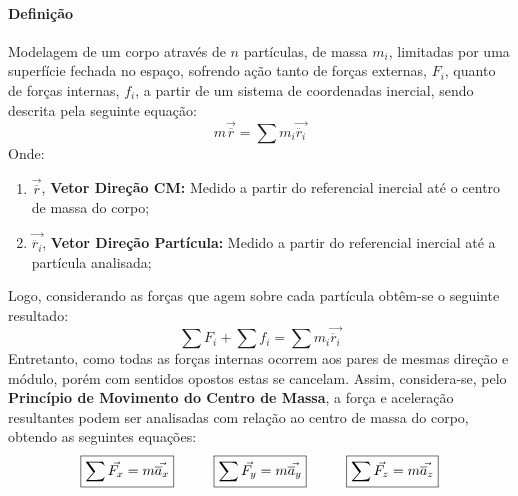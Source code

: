 \documentclass{article}
\begin{document}
            \paragraph{Definição}Modelagem de um corpo através de $n$ partículas, de massa $m_{i}$, limitadas por uma superfície fechada no espaço, sofrendo ação tanto de forças externas, $F_{i}$, quanto de forças internas, $f_{i}$, a partir de um sistema de coordenadas inercial, sendo descrita pela seguinte equação:
                \begin{equation}
                    m\vec{\overline{r}} = \sum m_{i}\vec{\ddot{r_{i}}}
                \end{equation}
            Onde:
                \begin{enumerate}[rightmargin = \leftmargin, noitemsep]
                    \item $\vec{\overline{r}}$, \textbf{Vetor Direção CM:} Medido a partir do referencial inercial até o centro de massa do corpo;
                    \item $\vec{\ddot{r_{i}}}$, \textbf{Vetor Direção Partícula:} Medido a partir do referencial inercial até a partícula analisada;
                \end{enumerate}
            Logo, considerando as forças que agem sobre cada partícula obtêm-se o seguinte resultado:
                \begin{equation}
                    \sum F_{i} + \sum f_{i} = \sum m_{i}\vec{\ddot{r_{i}}}
                \end{equation}
            Entretanto, como todas as forças internas ocorrem aos pares de mesmas direção e módulo, porém com sentidos opostos estas se cancelam. Assim, considera-se, pelo \textbf{Princípio de Movimento do Centro de Massa}, a força e aceleração resultantes podem ser analisadas com relação ao centro de massa do corpo, obtendo as seguintes equações:
                \begin{equation}
                    \boxed{
                        \sum\vec{F_{x}} = m \vec{\overline{a}_{x}}
                    }
                    \hspace{10mm}
                    \boxed{
                        \sum\vec{F_{y}} = m \vec{\overline{a}_{y}}
                    }
                    \hspace{10mm}
                    \boxed{
                        \sum\vec{F_{z}} = m \vec{\overline{a}_{z}}
                    }
                \end{equation}
\end{document}
